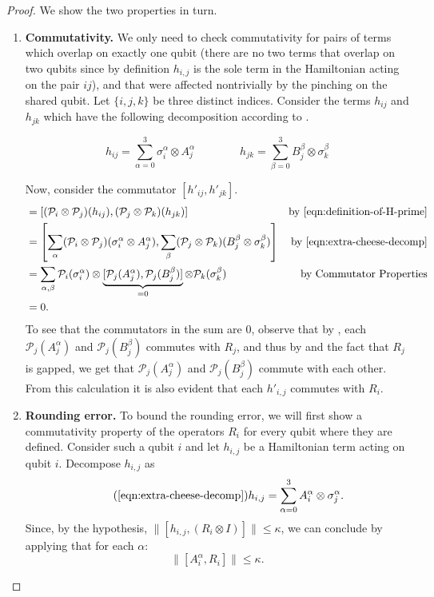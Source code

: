 \documentclass[11pt]{article}
\theoremstyle{plain}
\renewcommand{\cP}{\mathcal{P}}
\begin{document}
\begin{proof}

We show the two properties in turn.
\begin{enumerate}
    \item \textbf{Commutativity.} We only need to check commutativity for pairs of terms which overlap on exactly one qubit (there are no two terms that overlap on two qubits since by definition $h_{i,j}$ is the sole term in the Hamiltonian acting on the pair $ij$), and that were affected nontrivially by the pinching on the shared qubit. Let $\{i, j, k\}$ be three distinct indices. Consider the terms $h_{ij}$ and $h_{jk}$ which have the following decomposition according to .

    \begin{equation}\label{eqn:extra-cheese-decomp}
        h_{ij} = \sum\limits_{\alpha = 0}^3 \sigma^\alpha_i \otimes A_j^\alpha \quad\quad\quad\quad h_{jk} = \sum\limits_{\beta = 0}^3 B_j^\beta \otimes \sigma^\beta_k
    \end{equation}
    
Now, consider the commutator $[h'_{ij}, h'_{jk}]$.
\begin{align*}
    [h'_{ij}, h'_{jk}] &= [ (\cP_i \otimes \cP_j)(h_{ij}), (\cP_j \otimes \cP_k)(h_{jk}) ] & \text{by \Cref{eqn:definition-of-H-prime}}\\
    &= \left[ \sum_{\alpha} (\cP_i \otimes \cP_j)(\sigma^\alpha_i \otimes A_j^\alpha), \sum_{\beta} (\cP_j \otimes \cP_k)(B_j^\beta \otimes \sigma^\beta_k) \right ] & \text{by \Cref{eqn:extra-cheese-decomp}}\\
    &= \sum_{\alpha,\beta} \cP_i(\sigma_i^\alpha) \otimes \underbrace{[\cP_j(A^\alpha_j), \cP_j(B^\beta_j)]}_{=0} \otimes \cP_k(\sigma_k^\beta) & \text{by Commutator Properties}\\
    &= 0.
\end{align*}
To see that the commutators in the sum are $0$, observe that by , each $\cP_j(A_j^\alpha)$ and $\cP_j(B_j^\beta)$ commutes with $R_j$, and thus by  and the fact that $R_j$ is gapped, we get that $\cP_j(A_j^\alpha)$ and $\cP_j(B_j^\beta)$ commute with each other. From this calculation it is also evident that each $h'_{i,j}$ commutes with $R_i$. 

\item \textbf{Rounding error.} To bound the rounding error, we will first show a commutativity property of the operators $R_i$ for every qubit where they are defined. Consider such a qubit $i$ and let $h_{i,j}$ be a Hamiltonian term acting on qubit $i$. Decompose $h_{i,j}$ as
\begin{equation}\tag{\ref{eqn:extra-cheese-decomp}}
    h_{i,j}  = \sum_{\alpha=0}^3 A_i^\alpha \otimes \sigma_j^\alpha. 
\end{equation}
Since, by the hypothesis, $\|[h_{i,j},(R_i \otimes I) ]\| \leq \kappa$, we can conclude by applying  that for each $\alpha$:
\begin{equation}
 \| [A_i^\alpha, R_i] \| \leq \kappa. \label{eq:R-commutator}
\end{equation}



\end{enumerate}
\end{proof}
\end{document}
